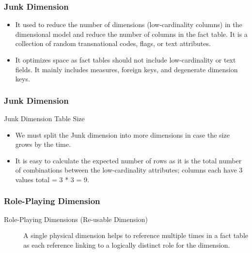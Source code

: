 \begin{frame}
    \frametitle{Junk Dimension}
	\begin{itemize}[<+->]
        \item It used to reduce the number of dimensions (low-cardinality columns) in the dimensional model and reduce the number of columns in the fact table. It is a collection of random transnational codes, flags, or text attributes.
		\item It optimizes space as fact tables should not include low-cardinality or text fields. It mainly includes measures, foreign keys, and degenerate dimension keys.
	\end{itemize}
    
\end{frame}
\begin{frame}
	\frametitle{Junk Dimension}

	\begin{block}{Junk Dimension Table Size}
		\begin{itemize}
			\item We must split the Junk dimension into more dimensions in case the size grows by the time.
			\item It is easy to calculate the expected number of rows as it is the total number of combinations between the low-cardinality attributes;  columns each have 3 values total = 3 * 3 = 9.
		\end{itemize}
	\end{block}
	
\end{frame}
\begin{frame}
    \frametitle{Role-Playing Dimension}
    \begin{description}
        \item [Role-Playing Dimensions (Re-usable Dimension)] A single physical dimension helps to reference multiple times in a fact table as each reference linking to a logically distinct role for the dimension.
    \end{description}
    \centering
    
\end{frame}
